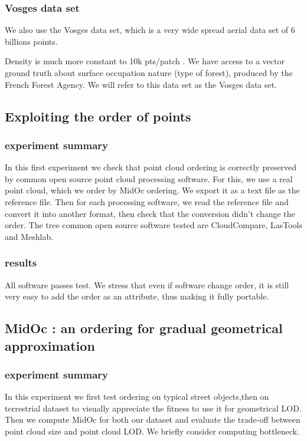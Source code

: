 		\subsubsection{Vosges data set}
			We also use the Vosges data set, which is a very wide spread aerial data set of 6 billions points. 
			
			Density is much more constant to 10k pts/patch .
			We have access to a vector ground truth about surface occupation nature (type of forest), produced by the French Forest Agency.
			We will refer to this data set as the Vosges data set.
		
	\subsection{Exploiting the order of points}
		\subsubsection{experiment summary}
			In this first experiment we check that point cloud ordering is correctly preserved by common open source point cloud processing software.
			For this, we use a real point cloud, which we order by MidOc ordering. 
			We export it as a text file as the reference file.
			Then for each processing software, we read the reference file and convert it into another format, then check that the conversion didn't change the order. 
			The tree common open source software tested are CloudCompare, LasTools and Meshlab.
		\subsubsection{results}  
			All software passes test.
			We stress that even if software change order, it is still very easy to add the order as an attribute, thus making it fully portable.
			
	\subsection{MidOc : an ordering for gradual geometrical approximation}
		\subsubsection{experiment summary}
			In this experiment we first test ordering on typical street objects,then on terrestrial dataset to visually appreciate the fitness to use it for geometrical LOD.
			Then we compute MidOc for both our dataset and evaluate the trade-off between point cloud size and point cloud LOD.
			We briefly consider computing bottleneck.
			
